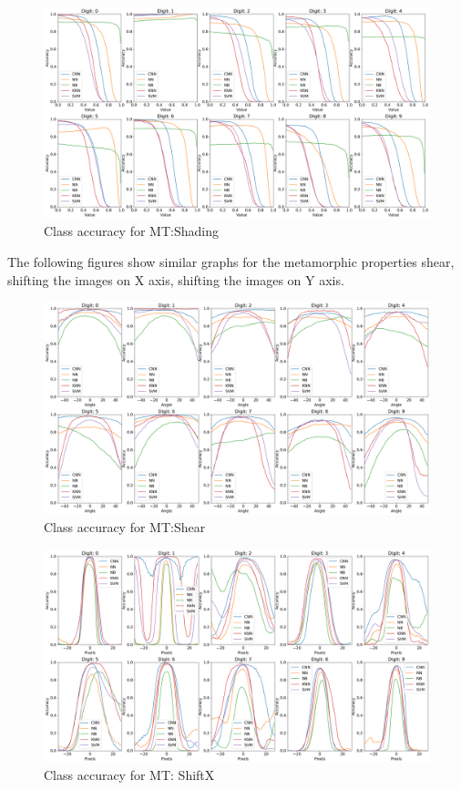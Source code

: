     \begin{figure}[H]
    \centering
        \includegraphics[width=\textwidth]{chapters/results/MT/ShadeAll.png}
        \caption{Class accuracy for MT:Shading}
        \label{fig:Digit by misclassification for Shading MR}
    \end{figure}
    
    The following figures show similar graphs for the metamorphic properties shear, shifting the images on X axis, shifting the images on Y axis.
    
    \begin{figure}[H]
    \centering
        \includegraphics[width=\textwidth]{chapters/results/MT/ShearAll.png}
        \caption{Class accuracy for MT:Shear}
        \label{fig:Digit by misclassification for Shear MR}
    \end{figure}
    
    \begin{figure}[ht!]
    \centering
        \includegraphics[width=\textwidth]{chapters/results/MT/ShiftXAll.png}
        \caption{Class accuracy for MT: ShiftX}
        \label{fig:Digit by misclassification for ShiftX MR}
    \end{figure}
    
